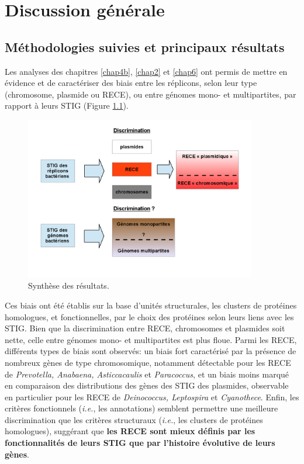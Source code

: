 \newpage
\chapter{Discussion générale}\label{discussionG}

\section{Méthodologies suivies et principaux résultats}
      Les analyses des chapitres \ref{chap4b}, \ref{chap2} et \ref{chap6} ont permis de mettre en évidence et de caractériser des biais entre les réplicons, selon leur type (chromosome, plasmide ou RECE), ou entre génomes mono- et multipartites, par rapport à leurs STIG (Figure \ref{figresschema}). 
   
\begin{figure}[H]
	\includegraphics[width=0.9\textwidth ]{./img/schema_discussion.png}
	\caption{Synthèse des résultats.}\label{figresschema}
\end{figure}
      
      Ces biais ont été établis sur la base d'unités structurales, les clusters de protéines homologues, et fonctionnelles, par le choix des protéines selon leurs liens avec les STIG. Bien que la discrimination entre RECE, chromosomes et plasmides soit nette, celle entre génomes mono- et multipartites est plus floue. Parmi les RECE, différents types de biais sont observés: un biais fort caractérisé par la présence de nombreux gènes de type chromosomique, notamment détectable pour les RECE de \textit{Prevotella, Anabaena, Asticcacaulis} et \textit{Paracoccus}, et un biais moins marqué en comparaison des distributions des gènes des STIG des plasmides, observable en particulier pour les RECE de \textit{Deinococcus, Leptospira} et \textit{Cyanothece}. Enfin, les critères fonctionnels (\textit{i.e.}, les annotations) semblent permettre une meilleure discrimination que les critères structuraux (\textit{i.e.}, les clusters de protéines homologues), suggérant que \textbf{les RECE sont mieux définis par les fonctionnalités de leurs STIG que par l'histoire évolutive de leurs gènes}. 
  	
